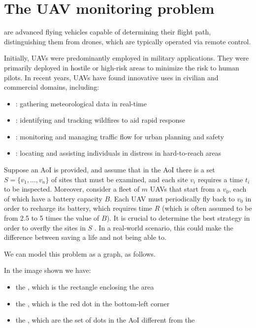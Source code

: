 \documentclass[a4paper, 12pt]{report}
\begin{document}
    \chapter{The UAV monitoring problem}
    
     are advanced flying vehicles capable of  determining their flight path, distinguishing them from drones, which are typically operated via remote control.

    Initially, UAVs were predominantly employed in military applications. They were primarily deployed in hostile or high-risk areas to minimize the risk to human pilots. In recent years, UAVs have found innovative uses in civilian and commercial domains, including:

    \begin{itemize}
        \item {}: gathering meteorological data in real-time
        \item {}: identifying and tracking wildfires to aid rapid response
        \item {}: monitoring and managing traffic flow for urban planning and safety
        \item {}: locating and assisting individuals in distress in hard-to-reach areas
    \end{itemize}

    Suppose an AoI is provided, and assume that in the AoI there is a set $S = \{v_1, \ldots, v_n\}$ of sites that must be examined, and each site $v_i$ requires a time $t_i$ to be inspected. Moreover, consider a fleet of $m$ UAVs that start from a  $v_0$, each of which have a battery capacity $B$. Each UAV must periodically fly back to $v_0$ in order to recharge its battery, which requires time $R$ (which is often assumed to be from 2.5 to 5 times the value of $B$). It is crucial to determine the best strategy in order to overfly the sites in $S$ . In a real-world scenario, this could make the difference between saving a life and not being able to.

    We can model this problem as a graph, as follows. 

    In the image shown we have:

    \begin{itemize}
        \item the , which is the rectangle enclosing the area
        \item the , which is the red dot in the bottom-left corner
        \item the , which are the set of dots in the AoI different from the 
    \end{itemize}
\end{document}
